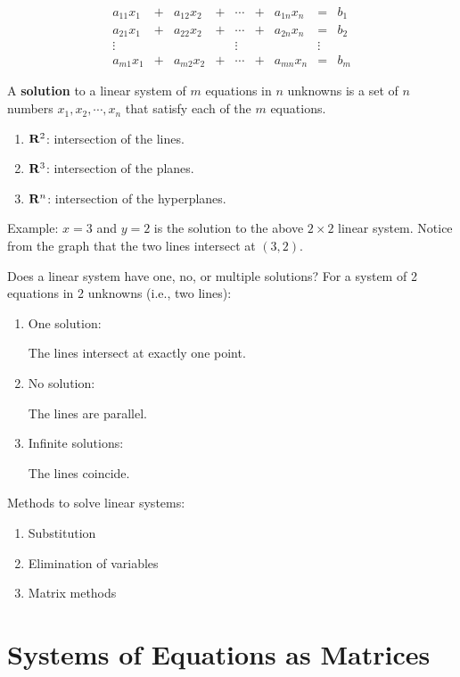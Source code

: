 \documentclass[]{book}
\providecommand{\tightlist}{%
  \setlength{\itemsep}{0pt}\setlength{\parskip}{0pt}}
\theoremstyle{definition}
\theoremstyle{definition}
\theoremstyle{definition}
\theoremstyle{remark}
\begin{document}
\[\begin{matrix}
            a_{11}x_1  & + & a_{12}x_2 & + & \cdots & + & a_{1n}x_n & = & b_1\\
            a_{21}x_1  & + & a_{22}x_2 & + & \cdots & + & a_{2n}x_n & = & b_2\\
            \vdots     &   &     &   & \vdots &   &     & \vdots & \\
            a_{m1}x_1  & + & a_{m2}x_2 & + & \cdots & + & a_{mn}x_n & = & b_m
            \end{matrix}\]

A \textbf{solution} to a linear system of \(m\) equations in \(n\)
unknowns is a set of \(n\) numbers \(x_1, x_2, \cdots, x_n\) that
satisfy each of the \(m\) equations.

\begin{enumerate} 
        \item ${\bf R}^2$: intersection of the lines. 
        \item ${\bf R}^3$: intersection of the planes.
        \item ${\bf R}^n$: intersection of the hyperplanes.
    \end{enumerate}

Example: \(x=3\) and \(y=2\) is the solution to the above \(2\times 2\)
linear system. Notice from the graph that the two lines intersect at
\((3,2)\).

Does a linear system have one, no, or multiple solutions? For a system
of 2 equations in 2 unknowns (i.e., two lines):

\begin{enumerate}
        \item \parbox[t]{1.5in}{One solution:} The lines intersect at exactly one point.
        \item \parbox[t]{1.5in}{No solution:}  The lines are parallel.
        \item \parbox[t]{1.5in}{Infinite solutions:} The lines coincide.
\end{enumerate}

Methods to solve linear systems:

\begin{enumerate}
\def\labelenumi{\arabic{enumi}.}
\tightlist
\item
  Substitution
\item
  Elimination of variables
\item
  Matrix methods
\end{enumerate}

\section{Systems of Equations as
Matrices}\label{systems-of-equations-as-matrices}
\end{document}
